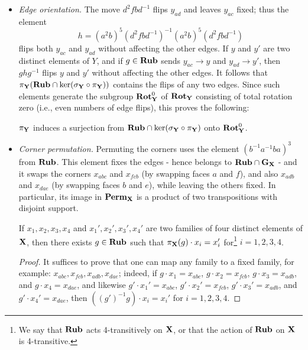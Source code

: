 \begin{itemize}
    \item \emph{Edge orientation.} The move $d^2fbd^{-1}$ flips $y_{ad}$ and leaves $y_{ac}$ fixed; thus the element
        $$
        h = (a^2b)^5 (d^2fbd^{-1})^{-1} (a^2b)^5 (d^2fbd^{-1})
        $$
        flips both $y_{ac}$ and $y_{ad}$ without affecting the other edges.
        If $y$ and $y'$ are two distinct elements of $Y$, and if $g \in \mathbf{Rub}$ sends $y_{ac} \to y$ and $y_{ad} \to y'$, then $ghg^{-1}$ flips $y$ and $y'$ without affecting the other edges.
        It follows that $\pi_{\mathbf{Y}}(\mathbf{Rub} \cap \ker(\sigma_{\mathbf{Y}} \circ \pi_{\mathbf{Y}}))$ contains the flips of any two edges.
        Since such elements generate the subgroup $\mathbf{Rot}_{\mathbf{Y}}^0$ of $\mathbf{Rot}_{\mathbf{Y}}$ consisting of total rotation zero (i.e., even numbers of edge flips), this proves the following:

    \begin{lemma}
        \label{lem:RotY0}
        $\pi_{\mathbf{Y}}$ induces a surjection from $\mathbf{Rub} \cap \ker(\sigma_{\mathbf{Y}} \circ \pi_{\mathbf{Y}})$ onto $\mathbf{Rot}_{\mathbf{Y}}^0$.
    \end{lemma}

    \item \emph{Corner permutation.}
    Permuting the corners uses the element $(b^{-1}a^{-1}ba)^3$ from $\mathbf{Rub}$.
    This element fixes the edges - hence belongs to $\mathbf{Rub} \cap \mathbf{G}_{\mathbf{X}}$ - and it swaps the corners $x_{abc}$ and $x_{fcb}$ (by swapping faces $a$ and $f$), and also $x_{adb}$ and $x_{dae}$ (by swapping faces $b$ and $e$), while leaving the others fixed.
    In particular, its image in $\mathbf{Perm}_{\mathbf{X}}$ is a product of two transpositions with disjoint support.

    \begin{lemma}
        \label{lem:trans_quadruple}
        If $x_1, x_2, x_3, x_4$ and $x_1', x_2', x_3', x_4'$ are two families of four distinct elements of $\mathbf{X}$, then there exists $g \in \mathbf{Rub}$ such that $\pi_{\mathbf{X}}(g) \cdot x_i = x_i'$ for\footnote{We say that $\mathbf{Rub}$ acts 4-transitively on $\mathbf{X}$, or that the action of $\mathbf{Rub}$ on $\mathbf{X}$ is 4-transitive.} $i = 1, 2, 3, 4$.
    \end{lemma}
    \begin{proof}
        It suffices to prove that one can map any family to a fixed family, for example: $x_{abc}, x_{fcb}, x_{adb}, x_{dae}$; indeed, if $g \cdot x_1 = x_{abc}$, $g \cdot x_2 = x_{fcb}$, $g \cdot x_3 = x_{adb}$, and $g \cdot x_4 = x_{dae}$, and likewise
        $g' \cdot x_1' = x_{abc}$, $g' \cdot x_2' = x_{fcb}$, $g' \cdot x_3' = x_{adb}$, and $g' \cdot x_4' = x_{dae}$, then
        $((g')^{-1}g) \cdot x_i = x_i'$ for $i = 1, 2, 3, 4$.


\end{proof}
\end{itemize}
